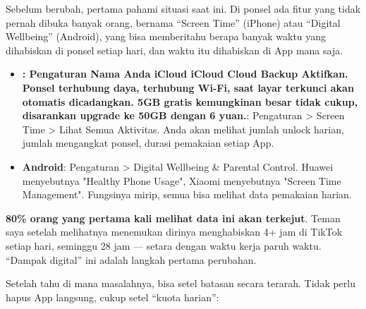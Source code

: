 


Sebelum berubah, pertama pahami situasi saat ini. Di ponsel ada fitur yang tidak pernah dibuka banyak orang, bernama “Screen Time” (iPhone) atau “Digital Wellbeing” (Android), yang bisa memberitahu berapa banyak waktu yang dihabiskan di ponsel setiap hari, dan waktu itu dihabiskan di App mana saja.

\begin{itemize}
  \item \textbf{: Pengaturan Nama Anda iCloud iCloud Cloud Backup Aktifkan. Ponsel terhubung daya, terhubung Wi-Fi, saat layar terkunci akan otomatis dicadangkan. 5GB gratis kemungkinan besar tidak cukup, disarankan upgrade ke 50GB dengan 6 yuan.}: Pengaturan > Screen Time > Lihat Semua Aktivitas. Anda akan melihat jumlah unlock harian, jumlah mengangkat ponsel, durasi pemakaian setiap App.
  \item \textbf{Android}: Pengaturan > Digital Wellbeing \& Parental Control. Huawei menyebutnya "Healthy Phone Usage", Xiaomi menyebutnya "Screen Time Management". Fungsinya mirip, semua bisa melihat data pemakaian harian.
\end{itemize}

\textbf{80\% orang yang pertama kali melihat data ini akan terkejut}. Teman saya setelah melihatnya menemukan dirinya menghabiskan 4+ jam di TikTok setiap hari, seminggu 28 jam — setara dengan waktu kerja paruh waktu. “Dampak digital” ini adalah langkah pertama perubahan.


Setelah tahu di mana masalahnya, bisa setel batasan secara terarah. Tidak perlu hapus App langsung, cukup setel “kuota harian”:

